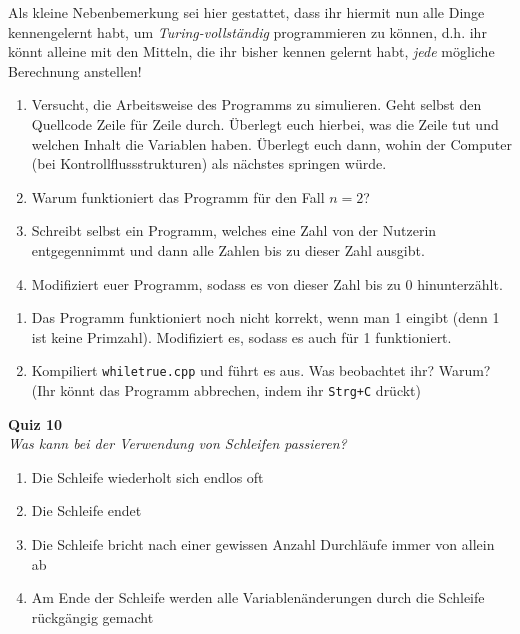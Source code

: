Als kleine Nebenbemerkung sei hier gestattet, dass ihr hiermit nun alle Dinge
kennengelernt habt, um \emph{Turing-vollständig} programmieren zu können, d.h.
ihr könnt alleine mit den Mitteln, die ihr bisher kennen gelernt habt,
\emph{jede} mögliche Berechnung anstellen!

\begin{praxis}
      \begin{enumerate}
            \item Versucht, die Arbeitsweise des Programms zu simulieren. Geht selbst
                  den Quellcode Zeile für Zeile durch. Überlegt euch hierbei, was die Zeile tut
                  und welchen Inhalt die Variablen haben. Überlegt euch dann, wohin der
                  Computer (bei Kontrollflussstrukturen) als nächstes springen würde.
            \item Warum funktioniert das Programm für den Fall $n = 2$?
            \item Schreibt selbst ein Programm, welches eine Zahl von der Nutzerin
                  entgegennimmt und dann alle Zahlen bis zu dieser Zahl ausgibt.
            \item Modifiziert euer Programm, sodass es von dieser Zahl bis zu 0
                  hinunterzählt.
      \end{enumerate}
\end{praxis}

\begin{spiel}
      \begin{enumerate}
            \item Das Programm funktioniert noch nicht korrekt, wenn man 1 eingibt
                  (denn 1 ist keine Primzahl). Modifiziert es, sodass es auch für 1
                  funktioniert.
            \item Kompiliert \texttt{whiletrue.cpp} und führt es aus. Was beobachtet
                  ihr? Warum? (Ihr könnt das Programm abbrechen, indem ihr
                  \texttt{Strg+C} drückt)
      \end{enumerate}
      
\end{spiel}

\textbf{Quiz 10}\\
\textit{Was kann bei der Verwendung von Schleifen passieren?}
\begin{enumerate}[label=\alph*)]
    \item Die Schleife wiederholt sich endlos oft
    \item Die Schleife endet
    \item Die Schleife bricht nach einer gewissen Anzahl Durchläufe immer von allein ab
    \item Am Ende der Schleife werden alle Variablenänderungen durch die Schleife rückgängig gemacht
\end{enumerate}
